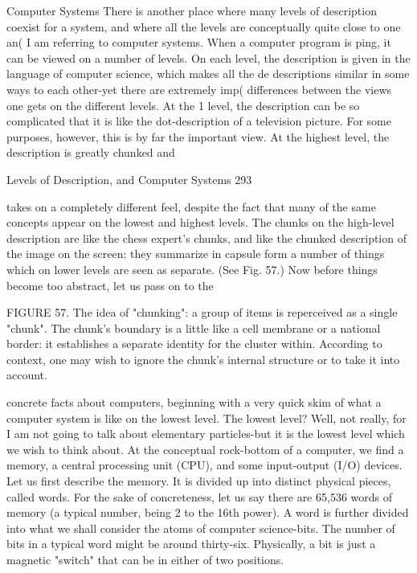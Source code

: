                                   Computer Systems
There is another place where many levels of description coexist for a system, and where
all the levels are conceptually quite close to one an( I am referring to computer systems.
When a computer program is ping, it can be viewed on a number of levels. On each level,
the description is given in the language of computer science, which makes all the de
descriptions similar in some ways to each other-yet there are extremely imp( differences
between the views one gets on the different levels. At the 1 level, the description can be
so complicated that it is like the dot-description of a television picture. For some
purposes, however, this is by far the important view. At the highest level, the description
is greatly chunked and




Levels of Description, and Computer Systems                                              293

takes on a completely different feel, despite the fact that many of the same concepts
appear on the lowest and highest levels. The chunks on the high-level description are like
the chess expert's chunks, and like the chunked description of the image on the screen:
they summarize in capsule form a number of things which on lower levels are seen as
separate. (See Fig. 57.) Now before things become too abstract, let us pass on to the




FIGURE 57. The idea of "chunking": a group of items is reperceived as a single "chunk".
The chunk's boundary is a little like a cell membrane or a national border: it establishes
a separate identity for the cluster within. According to context, one may wish to ignore
the chunk's internal structure or to take it into account.

concrete facts about computers, beginning with a very quick skim of what a computer
system is like on the lowest level. The lowest level? Well, not really, for I am not going
to talk about elementary particles-but it is the lowest level which we wish to think about.
        At the conceptual rock-bottom of a computer, we find a memory, a central
processing unit (CPU), and some input-output (I/O) devices. Let us first describe the
memory. It is divided up into distinct physical pieces, called words. For the sake of
concreteness, let us say there are 65,536 words of memory (a typical number, being 2 to
the 16th power). A word is further divided into what we shall consider the atoms of
computer science-bits. The number of bits in a typical word might be around thirty-six.
Physically, a bit is just a magnetic "switch" that can be in either of two positions.




